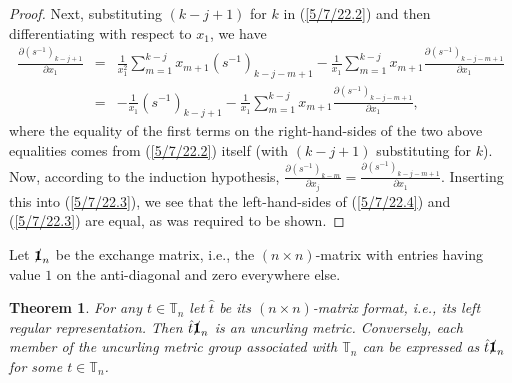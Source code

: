 \documentclass{amsart}
\numberwithin{equation}{section}
\newtheorem{theorem}{Theorem}
\theoremstyle{definition}
\numberwithin{theorem}{section}
\begin{document}
\begin{proof}
Next, substituting $(k-j+1)$ for $k$ in (\ref{5/7/22.2}) and then differentiating with respect to $x_1$, we have   \begin{eqnarray} \nonumber
 \frac{\partial \left( s^{-1} \right)_{k-j+1}}{\partial x_1} &=& \frac{1}{x_1^2} \sum_{m=1}^{k-j} x_{m+1} \left( s^{-1} \right)_{k-j-m+1}    - \frac{1}{x_1} \sum_{m=1}^{k-j} x_{m+1} \frac{\partial \left( s^{-1} \right)_{k-j-m+1}}{\partial x_1}  \\ &=& - \frac{1}{x_1}\left( s^{-1} \right)_{k-j+1}  -  \frac{1}{x_1} \sum_{m=1}^{k-j} x_{m+1} \frac{\partial \left( s^{-1} \right)_{k-j-m+1}}{\partial x_1},\label{5/7/22.3}\end{eqnarray} where the equality of the first terms on the right-hand-sides of the two above equalities comes from (\ref{5/7/22.2}) itself (with $(k-j+1)$ substituting for $k$). 
 Now, according to the induction hypothesis, $\frac{\partial \left( s^{-1} \right)_{k-m}}{\partial x_j} = \frac{\partial \left( s^{-1} \right)_{k-j-m+1}}{\partial x_1}$.  Inserting this into (\ref{5/7/22.3}), we see that the left-hand-sides of (\ref{5/7/22.4}) and (\ref{5/7/22.3}) are equal, as was required to be shown.
 \end{proof} 

Let $\slashed{\bf 1}_n$ be the exchange matrix, i.e., the $(n\times n)$-matrix with entries having value $1$ on the anti-diagonal and zero everywhere else.

\begin{theorem} \label{5/4/22.2} For any $t\in \mathbb{T}_n$ let $\hat{t}$ be its $(n\times n)$-matrix format, i.e., its left regular representation.    Then $\hat{t} \slashed{\bf 1}_n$ is an uncurling metric.  Conversely, each member of the uncurling metric group associated with $\mathbb{T}_n$ can be expressed as $\hat{t}\slashed{\bf 1}_n$ for some $t\in \mathbb{T}_n$.   \end{theorem}
\end{document}
